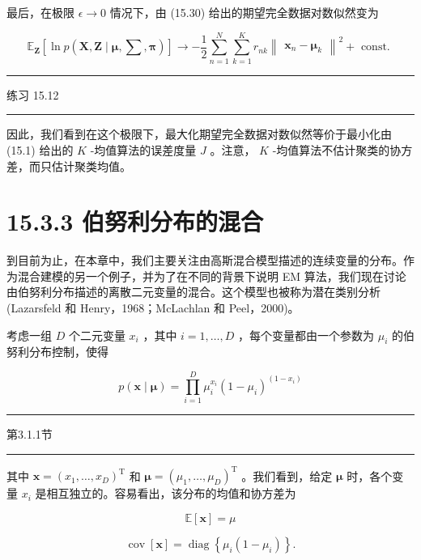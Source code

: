 \documentclass[10pt]{report}
\newcommand{\HRule}{\begin{center}\rule{0.9\linewidth}{0.2mm}\end{center}}
\begin{document}
最后，在极限 \(\epsilon  \rightarrow  0\) 情况下，由 (15.30) 给出的期望完全数据对数似然变为

\[
{\mathbb{E}}_{\mathbf{Z}}\left\lbrack  {\ln p\left( {\mathbf{X},\mathbf{Z} \mid  \mathbf{\mu },\mathbf{\sum },\mathbf{\pi }}\right) }\right\rbrack   \rightarrow   - \frac{1}{2}\mathop{\sum }\limits_{{n = 1}}^{N}\mathop{\sum }\limits_{{k = 1}}^{K}{r}_{nk}{\begin{Vmatrix}{\mathbf{x}}_{n} - {\mathbf{\mu }}_{k}\end{Vmatrix}}^{2} + \text{ const. } \tag{15.33}
\]

\HRule

练习 15.12

\HRule

因此，我们看到在这个极限下，最大化期望完全数据对数似然等价于最小化由 (15.1) 给出的 \(K\) -均值算法的误差度量 \(J\) 。注意， \(K\) -均值算法不估计聚类的协方差，而只估计聚类均值。

\section*{15.3.3 伯努利分布的混合}

到目前为止，在本章中，我们主要关注由高斯混合模型描述的连续变量的分布。作为混合建模的另一个例子，并为了在不同的背景下说明 EM 算法，我们现在讨论由伯努利分布描述的离散二元变量的混合。这个模型也被称为潜在类别分析(Lazarsfeld 和 Henry，1968；McLachlan 和 Peel，2000)。

考虑一组 \(D\) 个二元变量 \({x}_{i}\) ，其中 \(i = 1,\ldots ,D\) ，每个变量都由一个参数为 \({\mu }_{i}\) 的伯努利分布控制，使得

\[
p\left( {\mathbf{x} \mid  \mathbf{\mu }}\right)  = \mathop{\prod }\limits_{{i = 1}}^{D}{\mu }_{i}^{{x}_{i}}{\left( 1 - {\mu }_{i}\right) }^{\left( 1 - {x}_{i}\right) } \tag{15.34}
\]

\HRule

第3.1.1节

\HRule

其中 \(\mathbf{x} = {\left( {x}_{1},\ldots ,{x}_{D}\right) }^{\mathrm{T}}\) 和 \(\mathbf{\mu } = {\left( {\mu }_{1},\ldots ,{\mu }_{D}\right) }^{\mathrm{T}}\) 。我们看到，给定 \(\mathbf{\mu }\) 时，各个变量 \({x}_{i}\) 是相互独立的。容易看出，该分布的均值和协方差为

\[
\mathbb{E}\left\lbrack  \mathbf{x}\right\rbrack   = \mu  \tag{15.35}
\]

\[
\operatorname{cov}\left\lbrack  \mathbf{x}\right\rbrack   = \operatorname{diag}\left\{  {{\mu }_{i}\left( {1 - {\mu }_{i}}\right) }\right\}  . \tag{15.36}
\]
\end{document}
